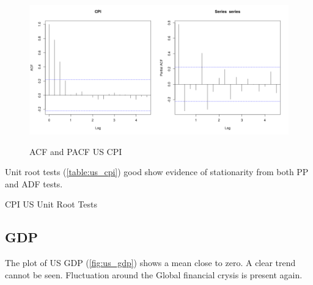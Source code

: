 \documentclass[10pt]{article}
\begin{document}
\begin{figure}[h!]
\centering
\includegraphics[width = 0.5\textwidth]{../acf/us_CPI}\includegraphics[width = 0.5\textwidth]{../pacf/us_CPI}
\caption{ACF and PACF US CPI}
\label{fig:us_cpi_acf}
\end{figure}

Unit root tests (\autoref{table:us_cpi}) good show evidence of stationarity from both PP and ADF tests.

\begin{table}[h!]
\centering
{}
\caption{CPI US Unit Root Tests}
\label{table:us_cpi}
\end{table}


\subsection{GDP}

The plot of US GDP (\autoref{fig:us_gdp}) shows a mean close to zero. A clear trend cannot be seen. Fluctuation around the Global financial crysis is present again.
\end{document}
